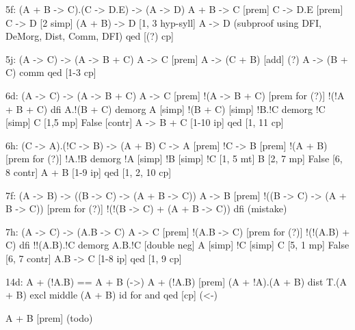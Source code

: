 5f:
(A + B -> C).(C -> D.E) -> (A -> D)
{
A + B -> C	[prem]
C -> D.E	[prem]
C -> D	[2 simp]
(A + B) -> D	[1, 3 hyp-syll]
A -> D	(subproof using DFI, DeMorg, Dist, Comm, DFI)
qed [(?) cp]
}

5j:
(A -> C) -> (A -> B + C)
{
A -> C	[prem]
A -> (C + B) [add] (?)
A -> (B + C) {comm}
qed [1-3 cp]
}

6d:
(A -> C) -> (A -> B + C)
{
A -> C	[prem]
	{
	!(A -> B + C)	[prem for (?)]
	!(!A + B + C)	{dfi}
	A.!(B + C)	{demorg}
	A	[simp]
	!(B + C)	[simp]
	!B.!C	{demorg}
	!C	[simp]
	C	[1,5 mp]
	False	[contr]
	}
A -> B + C	[1-10 ip]
qed	[1, 11 cp]
}

6h:
(C -> A).(!C -> B) -> (A + B)
{
C -> A	[prem]
!C -> B	[prem]
	{
	!(A + B)	[prem for (?)]
	!A.!B	{demorg}
	!A	[simp]
	!B	[simp]
	!C	[1, 5 mt]
	B	[2, 7 mp]
	False	[6, 8 contr]
	}
A + B	[1-9 ip]
qed	[1, 2, 10 cp]
}

7f:
(A -> B) -> ((B -> C) -> (A + B -> C))
{
A -> B	[prem]
	{
	!((B -> C) -> (A + B -> C))	[prem for (?)]
	!(!(B -> C) + (A + B -> C))	{dfi}
	(mistake)
	}
}

7h:
(A -> C) -> (A.B -> C)
{
A -> C	[prem]
	{
	!(A.B -> C)	[prem for (?)]
	!(!(A.B) + C)	{dfi}
	!!(A.B).!C	{demorg}
	A.B.!C	[double neg]
	A	[simp]
	!C	[simp]
	C	[5, 1 mp]
	False	[6, 7 contr]
	}
A.B -> C	[1-8 ip]
qed	[1, 9 cp]
}

14d:
A + (!A.B) == A + B
(->)
{
	A + (!A.B)	[prem]
	(A + !A).(A + B)	{dist}
	T.(A + B)	{excl middle}
	(A + B)	{id for and}
	qed	[cp]
}
(<-)
{
	A + B	[prem]
	(todo)
	
}